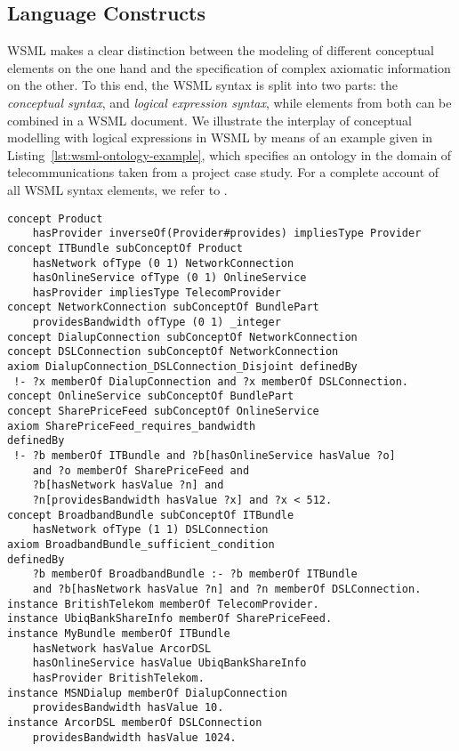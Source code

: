 \subsection{Language Constructs}
WSML makes a clear distinction between the modeling of different
conceptual elements on the one hand and the specification of complex
axiomatic information on the other. To this end, the WSML syntax is
split into two parts: the \emph{conceptual syntax},  and
\emph{logical expression syntax}, while elements from both can be
combined in a WSML document. We illustrate the interplay of
conceptual modelling with logical expressions in WSML by means of an
example given in Listing~\ref{lst:wsml-ontology-example}, which
specifies an ontology in the domain of telecommunications taken from
a project case study. For a complete account of all WSML syntax
elements, we refer to \cite{wsml-spec}.
\begin{lstlisting}[label=lst:wsml-ontology-example,style=wsml, caption=WSML Example Ontology]
concept Product
    hasProvider inverseOf(Provider#provides) impliesType Provider
concept ITBundle subConceptOf Product
    hasNetwork ofType (0 1) NetworkConnection
    hasOnlineService ofType (0 1) OnlineService
    hasProvider impliesType TelecomProvider
concept NetworkConnection subConceptOf BundlePart
    providesBandwidth ofType (0 1) _integer
concept DialupConnection subConceptOf NetworkConnection
concept DSLConnection subConceptOf NetworkConnection
axiom DialupConnection_DSLConnection_Disjoint definedBy
 !- ?x memberOf DialupConnection and ?x memberOf DSLConnection.
concept OnlineService subConceptOf BundlePart
concept SharePriceFeed subConceptOf OnlineService
axiom SharePriceFeed_requires_bandwidth
definedBy
 !- ?b memberOf ITBundle and ?b[hasOnlineService hasValue ?o]
    and ?o memberOf SharePriceFeed and
    ?b[hasNetwork hasValue ?n] and
    ?n[providesBandwidth hasValue ?x] and ?x < 512.
concept BroadbandBundle subConceptOf ITBundle
    hasNetwork ofType (1 1) DSLConnection
axiom BroadbandBundle_sufficient_condition
definedBy
    ?b memberOf BroadbandBundle :- ?b memberOf ITBundle
    and ?b[hasNetwork hasValue ?n] and ?n memberOf DSLConnection.
instance BritishTelekom memberOf TelecomProvider.
instance UbiqBankShareInfo memberOf SharePriceFeed.
instance MyBundle memberOf ITBundle
    hasNetwork hasValue ArcorDSL
    hasOnlineService hasValue UbiqBankShareInfo
    hasProvider BritishTelekom.
instance MSNDialup memberOf DialupConnection
    providesBandwidth hasValue 10.
instance ArcorDSL memberOf DSLConnection
    providesBandwidth hasValue 1024.
\end{lstlisting}


